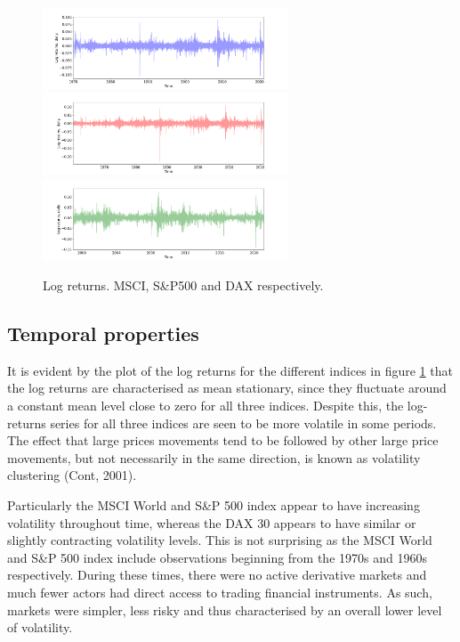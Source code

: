\begin{figure}[H] 
    \centering
    \includegraphics[width=0.65\textwidth]{analysis/data_description/images/MSCI_log_returns.png}
    \includegraphics[width=0.65\textwidth]{analysis/data_description/images/SP500_log_returns.png}
    \includegraphics[width=0.65\textwidth]{analysis/data_description/images/DAX_log_returns.png}
    \caption{Log returns. MSCI, S\&P500 and DAX respectively.}
    \label{fig: log_returns_all_indices}
\end{figure}


\label{subsection: distributional properties}

 
\subsection{Temporal properties}
\label{subsection: temporal properties}
It is evident by the plot of the log returns for the different indices in figure \ref{fig: log_returns_all_indices} that the log returns are characterised as mean stationary, since they fluctuate around a constant mean level close to zero for all three indices. Despite this, the log-returns series for all three indices are seen to be more volatile in some periods. The effect that large prices movements tend to be followed by other large price movements, but not necessarily in the same direction, is known as volatility clustering (Cont, 2001). 

Particularly the MSCI World and S\&P 500 index appear to have increasing volatility throughout time, whereas the DAX 30 appears to have similar or slightly contracting volatility levels. This is not surprising as the MSCI World and S\&P 500 index include observations beginning from the 1970s and 1960s respectively. During these times, there were no active derivative markets and much fewer actors had direct access to trading financial instruments. As such, markets were simpler, less risky and thus characterised by an overall lower level of volatility. 

